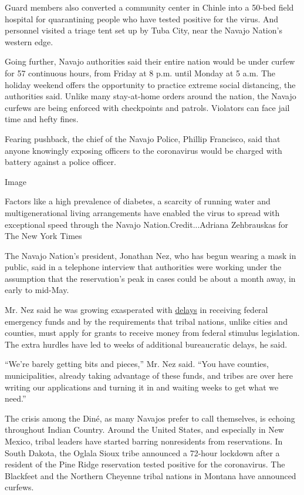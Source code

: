 Guard members also converted a community center in Chinle into a 50-bed
field hospital for quarantining people who have tested positive for the
virus. And personnel visited a triage tent set up by Tuba City, near the
Navajo Nation's western edge.

Going further, Navajo authorities said their entire nation would be
under curfew for 57 continuous hours, from Friday at 8 p.m. until Monday
at 5 a.m. The holiday weekend offers the opportunity to practice extreme
social distancing, the authorities said. Unlike many stay-at-home orders
around the nation, the Navajo curfews are being enforced with
checkpoints and patrols. Violators can face jail time and hefty fines.

Fearing pushback, the chief of the Navajo Police, Phillip Francisco,
said that anyone knowingly exposing officers to the coronavirus would be
charged with battery against a police officer.

Image

Factors like a high prevalence of diabetes, a scarcity of running water
and multigenerational living arrangements have enabled the virus to
spread with exceptional speed through the Navajo Nation.Credit...Adriana
Zehbrauskas for The New York Times

The Navajo Nation's president, Jonathan Nez, who has begun wearing a
mask in public, said in a telephone interview that authorities were
working under the assumption that the reservation's peak in cases could
be about a month away, in early to mid-May.

Mr. Nez said he was growing exasperated with
\href{https://www.politico.com/news/2020/03/20/coronavirus-american-indian-health-138724}{delays}
in receiving federal emergency funds and by the requirements that tribal
nations, unlike cities and counties, must apply for grants to receive
money from federal stimulus legislation. The extra hurdles have led to
weeks of additional bureaucratic delays, he said.

``We're barely getting bits and pieces,'' Mr. Nez said. ``You have
counties, municipalities, already taking advantage of these funds, and
tribes are over here writing our applications and turning it in and
waiting weeks to get what we need.''

The crisis among the Diné, as many Navajos prefer to call themselves, is
echoing throughout Indian Country. Around the United States, and
especially in New Mexico, tribal leaders have started barring
nonresidents from reservations. In South Dakota, the Oglala Sioux tribe
announced a 72-hour lockdown after a resident of the Pine Ridge
reservation tested positive for the coronavirus. The Blackfeet and the
Northern Cheyenne tribal nations in Montana have announced curfews.

